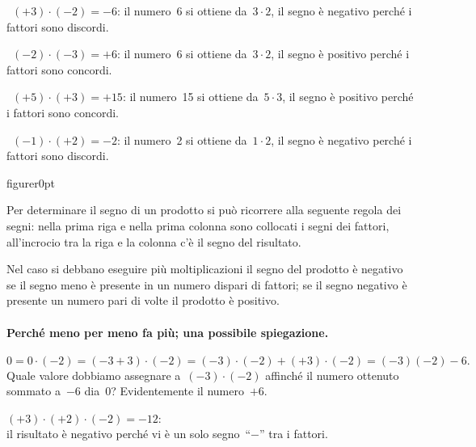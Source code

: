  \begin{esempio}{}{}
~\((+3)\cdot(-2)=-6\): il numero~6 si ottiene da~\(3\cdot2\), il segno è 
negativo 
perché i fattori sono discordi.
 \end{esempio}

 \begin{esempio}{}{}
~\((-2)\cdot(-3)=+6\): il numero~6 si ottiene da~\(3\cdot2\), il segno è 
positivo 
perché i fattori sono concordi.
 \end{esempio}
 \begin{esempio}{}{}
~\((+5)\cdot(+3)=+15\): il numero~15 si ottiene da~\(5\cdot3\), il segno è 
positivo 
perché i fattori sono concordi.
 \end{esempio}
 \begin{esempio}{}{}
~\((-1)\cdot(+2)=-2\): il numero~2 si ottiene da~\(1\cdot2\), il segno è 
negativo 
perché i fattori sono discordi.
 \end{esempio}


\begin{wrapfloat}{figure}{r}{0pt}
\moltsegni
% 
\end{wrapfloat}
Per determinare il segno di un prodotto si può ricorrere alla seguente 
regola 
dei segni: nella prima riga e
nella prima colonna sono collocati i segni dei fattori, all'incrocio tra la 
riga 
e la colonna c'è il segno
del risultato.

Nel caso si debbano eseguire più moltiplicazioni il segno del prodotto è 
negativo se il segno meno è presente
in un numero dispari di fattori; se il segno negativo è presente un numero 
pari 
di volte il prodotto è positivo.

\paragraph{Perché meno per meno fa più; una possibile spiegazione.}
\[0=0\cdot (-2) = (-3+3)\cdot (-2) = 
(-3)\cdot(-2)+(+3)\cdot(-2)=(-3)(-2)-6.\]
Quale valore dobbiamo assegnare a~\((-3)\cdot(-2)\) affinché il numero 
ottenuto 
sommato a~\(-6\) dia~0?
Evidentemente il numero~\(+6\).

 \begin{esempio}{}{}
\((+3)\cdot (+2)\cdot (-2) =-12\): \\
il risultato è negativo perché vi è un solo segno~``\(-\)'' tra i fattori.
 \end{esempio}

